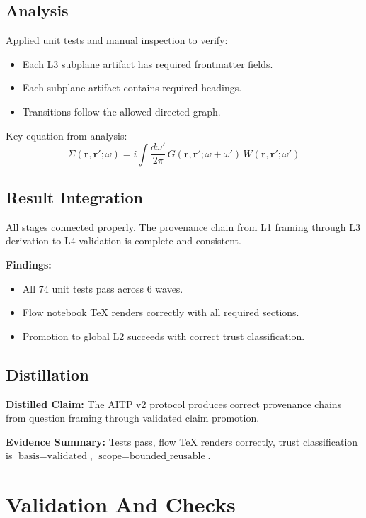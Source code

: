 \documentclass[11pt,a4paper]{article}
\begin{document}
\subsection{Analysis}
Applied unit tests and manual inspection to verify:
\begin{itemize}
  \item Each L3 subplane artifact has required frontmatter fields.
  \item Each subplane artifact contains required headings.
  \item Transitions follow the allowed directed graph.
\end{itemize}

Key equation from analysis:
\begin{equation}
  \Sigma(\mathbf{r}, \mathbf{r}'; \omega)
  = i \int \frac{d\omega'}{2\pi} \,
    G(\mathbf{r}, \mathbf{r}'; \omega + \omega') \,
    W(\mathbf{r}, \mathbf{r}'; \omega')
\end{equation}

\subsection{Result Integration}
All stages connected properly. The provenance chain from L1 framing
through L3 derivation to L4 validation is complete and consistent.

\textbf{Findings:}
\begin{itemize}
  \item All 74 unit tests pass across 6 waves.
  \item Flow notebook TeX renders correctly with all required sections.
  \item Promotion to global L2 succeeds with correct trust classification.
\end{itemize}

\subsection{Distillation}
\textbf{Distilled Claim:} The AITP v2 protocol produces correct
provenance chains from question framing through validated claim
promotion.

\textbf{Evidence Summary:} Tests pass, flow TeX renders correctly,
trust classification is $\text{basis} = \text{validated}$, $\text{scope}
= \text{bounded\_reusable}$.

\section{Validation And Checks}
\end{document}
